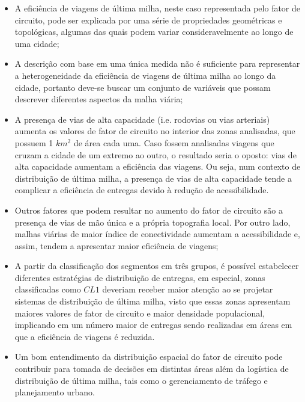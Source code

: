 \begin{itemize}
    \item A eficiência de viagens de última milha, neste caso representada pelo fator de circuito, pode ser explicada por uma série de propriedades geométricas e topológicas, algumas das quais podem variar consideravelmente ao longo de uma cidade;
    \item A descrição com base em uma única medida não é suficiente para representar a heterogeneidade da eficiência de viagens de última milha ao longo da cidade, portanto deve-se buscar um conjunto de variáveis que possam descrever diferentes aspectos da malha viária;
    \item A presença de vias de alta capacidade (i.e. rodovias ou vias arteriais) aumenta os valores de fator de circuito no interior das zonas analisadas, que possuem 1 $km^{2}$ de área cada uma.
    Caso fossem analisadas viagens que cruzam a cidade de um extremo ao outro, o resultado seria o oposto: vias de alta capacidade aumentam a eficiência das viagens.
    Ou seja, num contexto de distribuição de última milha, a presença de vias de alta capacidade tende a complicar a eficiência de entregas devido à redução de acessibilidade.
    \item Outros fatores que podem resultar no aumento do fator de circuito são a presença de vias de mão única e a própria topografia local. Por outro lado, malhas viárias de maior índice de conectividade aumentam a acessibilidade e, assim, tendem a apresentar maior eficiência de viagens;
    \item A partir da classificação dos segmentos em três grupos, é possível estabelecer diferentes estratégias de distribuição de entregas, em especial, zonas classificadas como $CL1$ deveriam receber maior atenção ao se projetar sistemas de distribuição de última milha, visto que essas zonas apresentam maiores valores de fator de circuito e maior densidade populacional, implicando em um número maior de entregas sendo realizadas em áreas em que a eficiência de viagens é reduzida.
    \item Um bom entendimento da distribuição espacial do fator de circuito pode contribuir para tomada de decisões em distintas áreas além da logística de distribuição de última milha, tais como o gerenciamento de tráfego e planejamento urbano.
\end{itemize}


